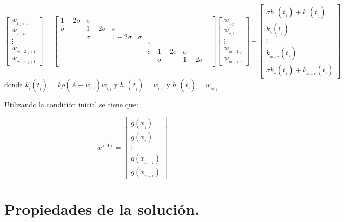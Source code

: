 $$
\begin{bmatrix} 
	w_{_{1,j+1}} \\
	w_{_{2,j+1}} \\
	\vdots\\
	w_{_{m-2,j+1}}\\
	w_{_{m-1,j+1}}
\end{bmatrix}=\begin{bmatrix}
	1-2\sigma  & \sigma    &           &        &      &  &  & \\
	\sigma     & 1-2\sigma & \sigma    &        &      &  &  &  \\
	& \sigma    & 1-2\sigma &\sigma  &      &  &  &  \\
	&           &           &        &\ddots&  &  &  \\
	&           &           &        &\sigma&1-2\sigma&\sigma\\     
	&           &           &        &      &\sigma   &1-2\sigma\\ 			  		     	
\end{bmatrix}\begin{bmatrix}
	w_{_{1,j}} \\
	w_{_{2,j}} \\
	\vdots\\
	w_{_{m-2,j}}\\
	w_{_{m-1,j}}
\end{bmatrix}+\begin{bmatrix}
	\sigma h_{_{1}}(t_{_{j}})+k_{_{1}}(t_{_{j}})\\
	k_{_{2}}(t_{_{j}})\\
	\vdots\\
	k_{_{m-2}}(t_{_{j}})\\
	\sigma h_{_{2}}(t_{_{j}}) + k_{_{m-1}}(t_{_{j}})
\end{bmatrix}		      			  		
$$
donde $k_{_{i}}(t_{_{j}})=k\rho(A-w_{_{i,j}})w_{_{i,j}}$ y $h_{_{1}}(t_{_{j}})=w_{_{0,j}}$ y $h_{_{2}}(t_{_{j}})=w_{_{m,j}}$
 
 Utilizando la condición inicial se tiene que:
 
 $$
 w^{(0)}=\begin{bmatrix}
 	g(x_{_{1}})\\
 	g(x_{_{2}})\\
 	\vdots\\          
 	g(x_{_{m-2}})\\ 
 	g(x_{_{m-1}})
 \end{bmatrix}
 $$
 \section{Propiedades de la solución.}
 
